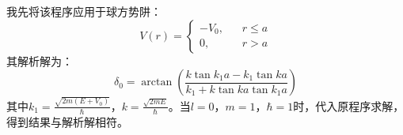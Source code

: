 \documentclass[hyperref,cs4size,titlepage,twoside]{ctexart}
\begin{document}
我先将该程序应用于球方势阱：
\begin{equation}\label{sq}
  V(r)=
\begin{cases}
  -V_0, & \;\;\;r\leq a \\
  0, &  \;\;\;r>a
\end{cases}
\end{equation}
其解析解为：
\begin{equation}\label{s}
  \delta_0=\arctan(\frac{k \tan k_1a-k_1\tan ka}{k_1+k\tan ka \tan k_1a})
\end{equation}
其中$\displaystyle k_1=\frac{\sqrt{2m(E+V_0)}}{\hbar}$，$\displaystyle k=\frac{\sqrt{2mE}}{\hbar}$。当$l=0$，$m=1$，$\hbar=1$时，代入原程序求解，得到结果与解析解相符。
\end{document}
